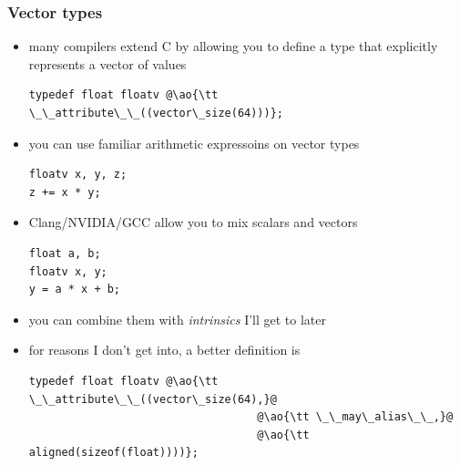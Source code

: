 \documentclass[12pt,dvipdfmx]{beamer}
\newcommand{\ao}[1]{{\color{blue}#1}}
\begin{document}
\begin{frame}[fragile]
\frametitle{Vector types}
\begin{itemize}
\item many compilers extend C by allowing you to define a type that explicitly represents a vector of values
\begin{lstlisting}
typedef float floatv @\ao{\tt \_\_attribute\_\_((vector\_size(64)))};
\end{lstlisting}

\item you can use familiar arithmetic expressoins on vector types
\begin{lstlisting}
floatv x, y, z;
z += x * y;
\end{lstlisting}

\item Clang/NVIDIA/GCC allow you to mix scalars and vectors
\begin{lstlisting}
float a, b;
floatv x, y;
y = a * x + b;
\end{lstlisting}

\item you can combine them with {\it intrinsics} I'll get to later
\item for reasons I don't get into, a better definition is
\begin{lstlisting}
typedef float floatv @\ao{\tt \_\_attribute\_\_((vector\_size(64),}@
                                   @\ao{\tt \_\_may\_alias\_\_,}@
                                   @\ao{\tt aligned(sizeof(float))))};
\end{lstlisting}

\end{itemize}
\end{frame}
\end{document}

